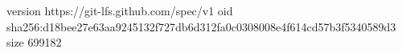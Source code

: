 version https://git-lfs.github.com/spec/v1
oid sha256:d18bee27e63aa9245132f727db6d312fa0c0308008e4f614cd57b3f5340589d3
size 699182
